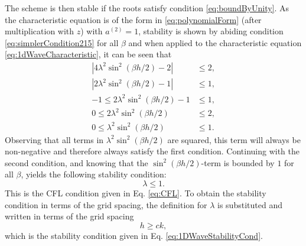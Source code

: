 {{%
The scheme is then stable if the roots satisfy condition \eqref{eq:boundByUnity}. As the characteristic equation is of the form in \eqref{eq:polynomialForm} (after multiplication with $z$) with $a^{(2)} = 1$, stability is shown by abiding condition 
\eqref{eq:simplerCondition215} for all $\beta$ and when applied to the characteristic equation \eqref{eq:1dWaveCharacteristic}, it can be seen that
\begin{equation}\nonumber
    \begin{aligned}
        |4\lambda^2\sin^2(\beta h/2) - 2| &\leq 2,\\
        |2\lambda^2\sin^2(\beta h/2) - 1| &\leq 1,\\
        -1 \leq 2\lambda^2\sin^2(\beta h/2) - 1 &\leq 1,\\
        0 \leq 2\lambda^2\sin^2(\beta h/2)&\leq 2,\\
        0\leq \lambda^2\sin^2(\beta h/2) &\leq 1.
    \end{aligned}
\end{equation}
Observing that all terms in $\lambda^2\sin^2(\beta h/2)$ are squared, this term will always be non-negative and therefore always satisfy the first condition. Continuing with the second condition, and knowing that the $\sin^2(\beta h / 2)$-term is bounded by $1$ for all $\beta$, yields the following stability condition:
\begin{equation*}
    \lambda \leq 1.
\end{equation*}
This is the CFL condition given in Eq. \eqref{eq:CFL}. To obtain the stability condition in terms of the grid spacing, the definition for $\lambda$ is substituted and written in terms of the grid spacing
\begin{equation}
    h \geq ck,
\end{equation}
which is the stability condition given in Eq. \eqref{eq:1DWaveStabilityCond}.

}}
